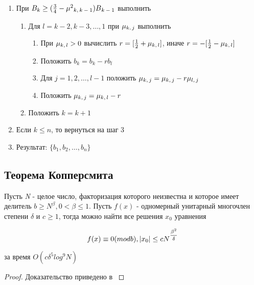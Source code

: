 \begin{enumerate}
     \item При {$ B_k \ge (\frac{3}{4} - \mu^2\textsubscript{{$k,k-1$}})B\textsubscript{{$k-1$}} $} выполнить
     
      \begin{enumerate}
       \item Для {$l=k-2,k-3,\dots,1$} при {$\mu\textsubscript{{$k,j$}}$} выполнить
       
	\begin{enumerate}
	  \item При {$ \mu\textsubscript{{$k,l$}} > 0 $} вычислить {$r=[\frac{1}{2} + \mu\textsubscript{{$k,l$}}]$}, иначе {$r=-[\frac{1}{2} - \mu\textsubscript{{$k,l$}}]$}
	  \item Положить {$b_k=b_k - r b_l$}   
	  \item Для {$j = 1, 2, \dots, l - 1$} положить {$\mu\textsubscript{{$k,j$}} = \mu\textsubscript{{$k,j$}} - r \mu\textsubscript{{$l,j$}}$}
	  \item Положить {$\mu\textsubscript{{$k,j$}} = \mu\textsubscript{{$k,l$}} - r$}
	\end{enumerate}
       
       \item  Положить {$k=k+1$}   
      \end{enumerate}
     
     \item Если {$k \le n$}, то вернуться на шаг 3
     \item Результат: {$\{ b_1,b_2, \dots, b_n \}$}
    \end{enumerate}


\subsection{Теорема Копперсмита}

  \begin{theorem}
   Пусть \textit{N} - целое число, факторизация которого неизвестна и которое имеет делитель {$b \ge N^\beta, 0 < \beta \le 1$}. Пусть {$f(x)$} - одномерный унитарный
   многочлен степени {$\delta$} и {$c \ge 1$}, тогда можно найти все решения {$x_0$} уравнения
   
    \begin{equation}
     \textit{{$ f(x) \equiv 0(mod b), |x_0| \le c N\textsuperscript{{$\frac{\beta^2}{\delta}$}} $}}
    \end{equation}

    за время {$O(c \delta^5 log^9 N)$}
    
    \begin{proof}
     Доказательство приведено в \cite[Глава 8.2, страницы 320-350]{may10}
    \end{proof}

  \end{theorem}
  
